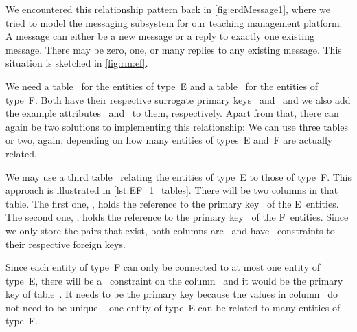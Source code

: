 We encountered this relationship pattern back in \cref{fig:erdMessage1}, where we tried to model the messaging subsystem for our teaching management platform.
A message can either be a new message or a reply to exactly one existing message.
There may be zero, one, or many replies to any existing message.
This situation is sketched in \cref{fig:rm:ef}.

We need a table~ for the entities of type~E and a table~ for the entities of type~F.
Both have their respective surrogate primary keys~ and~ and we also add the example attributes~ and~ to them, respectively.
Apart from that, there can again be two solutions to implementing this relationship:
We can use three tables or two, again, depending on how many entities of types~E and~F are actually related.

We may use a third table~ relating the entities of type~E to those of type~F.
This approach is illustrated in \cref{lst:EF_1_tables}.
There will be two columns in that table.
The first one, , holds the reference to the primary key~ of the E~entities.
The second one, , holds the reference to the primary key~ of the F~entities.
Since we only store the pairs that exist, both columns are~ and have~ constraints to their respective foreign keys.

Since each entity of type~F can only be connected to at most one entity of type~E, there will be a~ constraint on the column~ and it would be the primary key of table~.
It needs to be the primary key because the values in column~ do not need to be unique -- one entity of type~E can be related to many entities of type~F.


